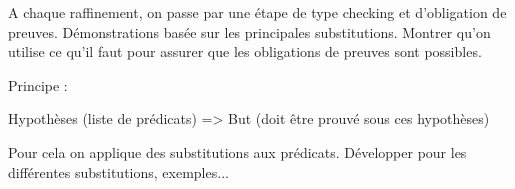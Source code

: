 A chaque raffinement, on passe par une étape de type checking et
d'obligation de preuves. Démonstrations basée sur les principales
substitutions. Montrer qu'on utilise ce qu'il faut pour assurer que
les obligations de preuves sont possibles.

Principe :

Hypothèses (liste de prédicats)
=>
But (doit être prouvé sous ces hypothèses)

Pour cela on applique des substitutions aux prédicats. Développer pour les
différentes substitutions, exemples...

